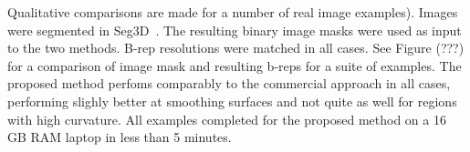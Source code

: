%
Qualitative comparisons are made for a number of real image examples). Images were segmented in Seg3D~\cite{Seg3D}. The resulting binary image masks were used as input to the two methods. B-rep resolutions were matched in all cases. See Figure (???) for a comparison of image mask and resulting b-reps for a suite of examples. The proposed method perfoms comparably to the commercial approach in all cases, performing slighly better at smoothing surfaces and not quite as well for regions with high curvature. All examples completed for the proposed method on a 16 GB RAM laptop in less than 5 minutes.